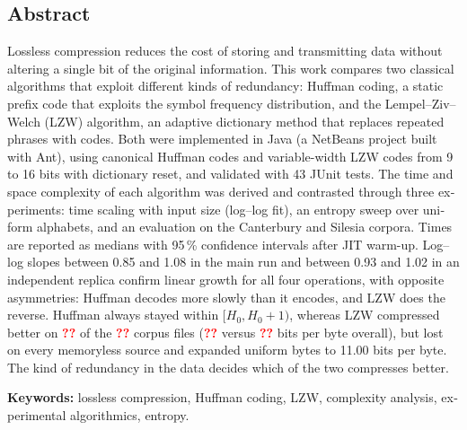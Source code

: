 \documentclass[11pt,a4paper]{article}
\newcommand{\resmissing}{\textcolor{red}{\textbf{??}}}
\providecommand{\resCorpusFiles}{\resmissing}
\providecommand{\resLzwWins}{\resmissing}
\providecommand{\resCorpusHuffBpb}{\resmissing}
\providecommand{\resCorpusLzwBpb}{\resmissing}
\begin{document}
\begin{otherlanguage}{english}
\section*{Abstract}
Lossless compression reduces the cost of storing and transmitting data without altering a
single bit of the original information. This work compares two classical algorithms that
exploit different kinds of redundancy: Huffman coding, a static prefix code that exploits
the symbol frequency distribution, and the Lempel--Ziv--Welch (LZW) algorithm, an adaptive
dictionary method that replaces repeated phrases with codes. Both were implemented in Java
(a NetBeans project built with Ant), using canonical Huffman codes and variable-width LZW
codes from 9 to 16 bits with dictionary reset, and validated with 43 JUnit tests. The time and
space complexity of each algorithm was derived and contrasted through three experiments:
time scaling with input size (log--log fit), an entropy sweep over uniform alphabets, and an
evaluation on the Canterbury and Silesia corpora. Times are reported as medians with 95\,\% confidence
intervals after JIT warm-up.
Log--log slopes between 0.85 and 1.08 in the main run and between 0.93 and 1.02 in an
independent replica confirm linear growth for all four operations, with opposite asymmetries:
Huffman decodes more slowly than it encodes, and LZW does the reverse. Huffman always stayed
within $[H_0, H_0 + 1)$, whereas LZW compressed better on \resLzwWins{} of the
\resCorpusFiles{} corpus files (\resCorpusLzwBpb{} versus \resCorpusHuffBpb{} bits per byte
overall), but lost on every memoryless source and expanded uniform bytes to 11.00 bits per byte.
The kind of redundancy in the data decides which of the two compresses better.

\medskip\noindent\textbf{Keywords:} lossless compression, Huffman coding, LZW, complexity
analysis, experimental algorithmics, entropy.
\end{otherlanguage}

\clearpage
\tableofcontents
\clearpage
\listoffigures
\listoftables
\listofalgorithms
\lstlistoflistings
\clearpage
{}









\clearpage
{}
{}



\clearpage
\appendix

\end{document}

